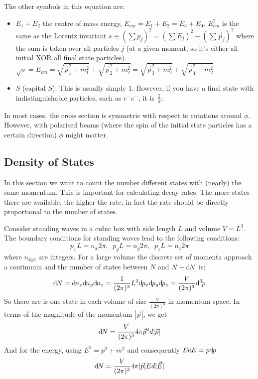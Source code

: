 The other symbols in this equation are:
\begin{itemize}
\item $E_1 + E_2$ the centre of mass energy, $E_{cm} = E_1 + E_2 = E_3 + E_4$. $E_{cm}^2$ is the same as the Lorentz invariant $s \equiv (\sum p_j)^2 = (\sum E_j)^2 - (\sum \vec{p}_j)^2$ where the sum is taken over all particles $j$ (at a given moment, so it's either all initial XOR all final state particles). $ \sqrt{s} = E_{cm}= \sqrt{\vec{p}_1^2 + m_1^2} + \sqrt{\vec{p}_2^2 + m_2^2} = \sqrt{\vec{p}_3^2 + m_2^2} + \sqrt{\vec{p}_4^2 + m_2^2}$
\item $S$ (capital $S$): This is usually simply $1$. However, if you have a final state with indistinguishable particles, such as $e^- e^-$, it is $\frac{1}{2}$.
\end{itemize}
In most cases, the cross section is symmetric with respect to rotations around $\phi$. However, with polarised beams (where the spin of the initial state particles has a certain direction) $\phi$ might matter.

\subsection{Density of States}
\label{sec:densityOfStates}
In this section we want to count the number different states with (nearly) the same momentum. This is important for calculating decay rates. The more states there are available, the higher the rate, in fact the rate should be directly proportional to the number of states.

 Consider standing waves in a cubic box with side length $L$ and volume $V=L^3$. The boundary conditions for standing waves lead to the following conditions:
\begin{equation}
 p_x L = n_x 2\pi,\;\;
 p_y L = n_y 2\pi,\;\;
 p_z L = n_z 2\pi
\end{equation}
 where $n_{xyz}$ are integers. For a large volume the discrete set of
 momenta approach a continuum and the number of states between $N$
 and $N+\mathrm{d}\:\!\!N$ is:
\begin{equation}
 \dx{N} = \dx{n_x}\dx{n_y}\dx{n_z}
        = \frac{1}{(2\pi)^3} L^3 \dx{p_x}\dx{p_y}\dx{p_z}
        = \frac{V}{(2\pi)^3} \dIII{p}
\end{equation}
So there are is one state in each volume of size $\frac{V}{(2\pi)^3}$ in momentum space. In terms of the magnitude of the momentum $|\vec{p}|$, we get
\begin{equation}
\mathrm{d}\:\!\!N = \frac{V}{(2\pi)^3} 4\pi \vec{p}^2 d|\vec{p}|
\end{equation}
And for the energy, using $E^2 = p^2 + m^2$ and consequently $E\mathrm{d}\:\!\!E = p\mathrm{d}\:\!\!p$
\begin{equation}
\mathrm{d}\:\!\!N = \frac{V}{(2\pi)^3} 4\pi |\vec{p}| E d|\vec{E}|
\end{equation}

